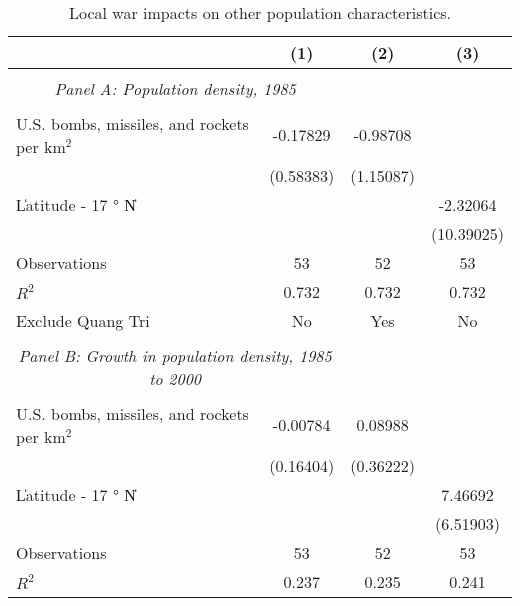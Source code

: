 \begin{table}[htbp]\centering \\ \def\sym#1{\ifmmode^{#1}\else\(^{#1}\)\fi} \\ \caption{Local war impacts on other population characteristics.} \\ \begin{tabular}{l*{3}{c}} \hline\hline
                    &\multicolumn{1}{c}{(1)}         &\multicolumn{1}{c}{(2)}         &\multicolumn{1}{c}{(3)}         \\
\hline \\ \multicolumn{2}{c}{\emph{Panel A: Population density, 1985}} \\\\[-1ex]
U.S. bombs, missiles, and rockets per km$^2$&    -0.17829         &    -0.98708         &                     \\
                    &   (0.58383)         &   (1.15087)         &                     \\
[1em]
\|Latitude - 17 $°$ N\|&                     &                     &    -2.32064         \\
                    &                     &                     &  (10.39025)         \\
\hline
Observations        &          53         &          52         &          53         \\
\(R^{2}\)           &       0.732         &       0.732         &       0.732         \\
Exclude Quang Tri   &          No         &         Yes         &          No         \\
\hline \\ \multicolumn{2}{c}{\emph{Panel B: Growth in population density, 1985 to 2000}} \\\\[-1ex]
U.S. bombs, missiles, and rockets per km$^2$&    -0.00784         &     0.08988         &                     \\
                    &   (0.16404)         &   (0.36222)         &                     \\
[1em]
\|Latitude - 17 $°$ N\|&                     &                     &     7.46692         \\
                    &                     &                     &   (6.51903)         \\
\hline
Observations        &          53         &          52         &          53         \\
\(R^{2}\)           &       0.237         &       0.235         &       0.241         \\

\end{tabular}
\end{table}
